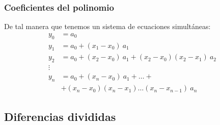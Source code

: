 \documentclass[12pt]{beamer}
\begin{document}
\begin{frame}
\frametitle{Coeficientes del polinomio}
De tal manera que tenemos un sistema de ecuaciones simultáneas:
\pause
\begin{align*}
y_{0} &= a_{0} \\
y_{1} &= a_{0} + (x_{1} - x_{0}) \: a_{1} \\
y_{2} &= a_{0} + (x_{2} - x_{0}) \: a_{1} + (x_{2} - x_{0})(x_{2} - x_{1}) \: a_{2} \\
\vdots \\
y_{n} &= a_{0} + (x_{n} - x_{0}) \: a_{1} + \ldots + \\
&+ (x_{n} - x_{0})(x_{n} - x_{1}) \ldots (x_{n} - x_{n - 1}) \: a_{n}
\end{align*}
\end{frame}

\subsection{Diferencias divididas}
\end{document}
